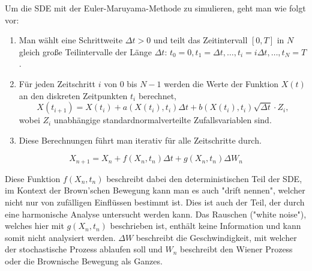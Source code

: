 Um die SDE mit der Euler-Maruyama-Methode zu simulieren, geht man wie folgt vor:

\begin{enumerate}
	\item Man wählt eine Schrittweite $\Delta t > 0$ und teilt das Zeitintervall $[0, T]$ in $N$ gleich große Teilintervalle der Länge $\Delta t$: $t_0 = 0, t_1 = \Delta t, \dots, t_i = i\Delta t, \dots, t_N = T$.
	\item Für jeden Zeitschritt $i$ von $0$ bis $N-1$ werden die Werte der Funktion $X(t)$ an den diskreten Zeitpunkten $t_i$ berechnet,
	\begin{equation}
		X(t_{i+1}) = X(t_i) + a(X(t_i), t_i) \Delta t + b(X(t_i), t_i) \sqrt{\Delta t} \cdot Z_i,
	\end{equation}
	wobei $Z_i$ unabhängige standardnormalverteilte Zufallsvariablen sind.
	\item Diese Berechnungen führt man iterativ für alle Zeitschritte durch.
\end{enumerate}

\begin{equation}
	X_{n+1} = X_n + f(X_n,t_n) \Delta t + g(X_n,t_n) \Delta W_n
\end{equation}

Diese Funktion $ f(X_n,t_n) $ beschreibt dabei den deterministischen Teil der SDE, im Kontext der Brown'schen Bewegung kann man es auch "drift nennen", welcher nicht nur von zufälligen Einflüssen bestimmt ist. Dies ist auch der Teil, der durch eine harmonische Analyse untersucht werden kann. Das Rauschen ("white noise"), welches hier mit $ g(X_n,t_n) $ beschrieben ist, enthält keine Information und kann somit nicht analysiert werden. $ \Delta W $ beschreibt die Geschwindigkeit, mit welcher der stochastische Prozess ablaufen soll und $ W_n $  beschreibt den Wiener Prozess oder die Brownische Bewegung als Ganzes.

